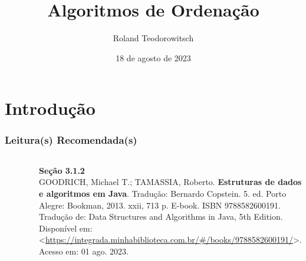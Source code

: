 \documentclass[aspectratio=169]{beamer}
\title[\sc{Algoritmos de Ordenação}]{Algoritmos de Ordenação}
\author[Roland Teodorowitsch]{Roland Teodorowitsch}
\institute[ALEST I - EP - PUCRS]{Algoritmos e Estruturas de Dados I - Escola Politécnica - PUCRS}
\date{18 de agosto de 2023}
\begin{document}
\justifying

\begin{frame}
	\titlepage
\end{frame}

\section{Introdução}

\begin{frame}\frametitle{Leitura(s) Recomendada(s)}

\begin{columns}[T]
\begin{column}{0.15\linewidth}
\vspace{-3mm}
\begin{figure}[h]
	\centering
	\includegraphics[height=0.3\paperheight]{imagens/livro_goodrich.jpg}
\end{figure}
\end{column}
\begin{column}{0.85\linewidth}
\vspace{3mm}
\textbf{Seção 3.1.2}\\
\scriptsize{GOODRICH, Michael T.; TAMASSIA, Roberto. \textbf{Estruturas de dados e algoritmos em Java}. Tradução: Bernardo Copstein. 5. ed. Porto Alegre: Bookman, 2013. xxii, 713 p. E-book. ISBN 9788582600191. Tradução de: Data Structures and Algorithms in Java, 5th Edition. Disponível em: \textless{}\url{https://integrada.minhabiblioteca.com.br/\#/books/9788582600191/}\textgreater{}. Acesso em: 01 ago. 2023.}
\end{column}
\end{columns}

\end{frame}
\end{document}
